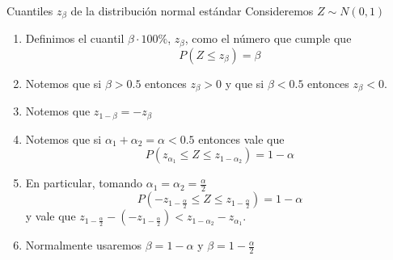 \documentclass{beamer}
\theoremstyle{definition}
\begin{document}
\begin{frame}{\color{rosee} Cuantiles $z_{\beta}$ de la distribución normal estándar}
\small
Consideremos $Z\sim N(0,1)$
    \begin{enumerate}
        \item Definimos el cuantil $\beta\cdot 100\%$, $z_{\beta}$, como el número que cumple que \[P(Z\leq z_{\beta})=\beta\]
        \item Notemos que si $\beta>0.5$ entonces $z_{\beta}>0$ y que si $\beta<0.5$ entonces $z_{\beta}<0$.
        \item Notemos que $z_{1-\beta}=-z_{\beta}$
        \item Notemos que si $\alpha_1+\alpha_2=\alpha<0.5$ entonces vale que 
        \[P(z_{\alpha_1}\leq Z \leq  z_{1-\alpha_2})=1-\alpha\]
        \item En particular, tomando $\alpha_1=\alpha_2=\frac{\alpha}{2}$
        \[P\left(-z_{1-\frac{\alpha}{2}}\leq Z \leq  z_{1-\frac{\alpha}{2}}\right)=1-\alpha\]
        y vale que $z_{1-\frac{\alpha}{2}}-(-z_{1-\frac{\alpha}{2}})<z_{1-\alpha_2}-z_{\alpha_1}$.
        \item Normalmente usaremos $\beta=1-\alpha$ y $\beta=1-\frac{\alpha}{2}$
    \end{enumerate}
\end{frame}
\end{document}
